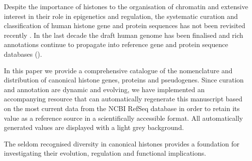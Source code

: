   Despite the importance of histones to the organisation of chromatin and extensive interest
  in their role in epigenetics and regulation, the systematic curation and classification of human histone
  gene and protein sequences has not been revisited recently \citep{Marzluff02}.
  In the last decade the draft human genome has been finalised 
  and rich annotations continue to propagate into reference gene and protein sequence databases ().


  In this paper we provide a comprehensive catalogue of the nomenclature and distribution 
  of canonical histone genes, proteins and pseudogenes. 
  Since curation and annotation are dynamic and evolving, we have implemented an accompanying resource 
  that can automatically regenerate this manuscript based on the most current data from the NCBI RefSeq database 
  in order to retain its value as a reference source in a scientifically accessible format.
  All automatically generated values are displayed with a light grey background.
  
  The seldom recognised diversity in canonical histones provides a foundation for investigating 
  their evolution, regulation and functional implications.


